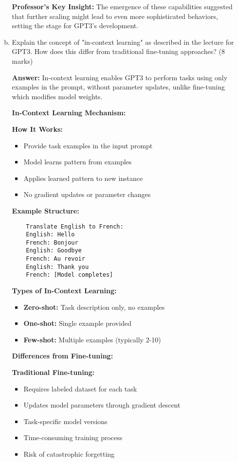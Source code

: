\documentclass[12pt]{article}
\newcommand{\answer}[1]{{\color{answercolor}\textbf{Answer:} #1}}
\newcommand{\explanation}[1]{{\color{explanationcolor}#1}}
\begin{document}
\begin{enumerate}
\begin{enumerate}[(a)]
{    \textbf{Professor's Key Insight:}
    The emergence of these capabilities suggested that further scaling might lead to even more sophisticated behaviors, setting the stage for GPT3's development.
    }
    
    \item Explain the concept of "in-context learning" as described in the lecture for GPT3. How does this differ from traditional fine-tuning approaches? \hfill (8 marks)
    
    \answer{In-context learning enables GPT3 to perform tasks using only examples in the prompt, without parameter updates, unlike fine-tuning which modifies model weights.}
    
    \explanation{
    \textbf{In-Context Learning Mechanism:}
    
    \textbf{How It Works:}
    \begin{itemize}
        \item Provide task examples in the input prompt
        \item Model learns pattern from examples
        \item Applies learned pattern to new instance
        \item No gradient updates or parameter changes
    \end{itemize}
    
    \textbf{Example Structure:}
    \begin{verbatim}
    Translate English to French:
    English: Hello
    French: Bonjour
    English: Goodbye  
    French: Au revoir
    English: Thank you
    French: [Model completes]
    \end{verbatim}
    
    \textbf{Types of In-Context Learning:}
    \begin{itemize}
        \item \textbf{Zero-shot:} Task description only, no examples
        \item \textbf{One-shot:} Single example provided
        \item \textbf{Few-shot:} Multiple examples (typically 2-10)
    \end{itemize}
    
    \textbf{Differences from Fine-tuning:}
    
    \textbf{Traditional Fine-tuning:}
    \begin{itemize}
        \item Requires labeled dataset for each task
        \item Updates model parameters through gradient descent
        \item Task-specific model versions
        \item Time-consuming training process
        \item Risk of catastrophic forgetting
    \end{itemize}
    
}
\end{enumerate}
\end{enumerate}
\end{document}
